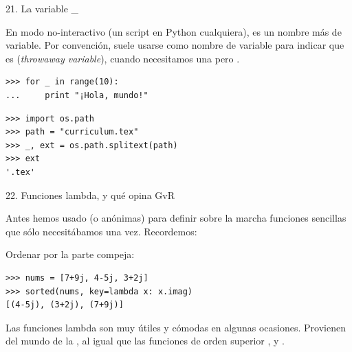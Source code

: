 \documentclass[14pt]{beamer}
\begin{document}
\begin{frame}[fragile]{21. La variable \_}
  \begin{block}{}
    \small
    \centering
    En modo no-interactivo (un script en Python cualquiera),
    \structure{\_} es un nombre más de variable. Por convención, suele
    usarse como nombre de variable para indicar que es
     (\emph{throwaway variable}), cuando
    necesitamos una pero .
  \end{block}

  \footnotesize
  \begin{exampleblock}{}
    \begin{lstlisting}
>>> for _ in range(10):
...     print "¡Hola, mundo!"
    \end{lstlisting}
  \end{exampleblock}


  \begin{exampleblock}{}
    \begin{lstlisting}
>>> import os.path
>>> path = "curriculum.tex"
>>> _, ext = os.path.splitext(path)
>>> ext
'.tex'
    \end{lstlisting}
  \end{exampleblock}
\end{frame}

\begin{frame}[fragile]{22. \large Funciones lambda, y qué opina GvR}
  \small
  \begin{center}
    Antes hemos usado  (o anónimas) para
    definir sobre la marcha funciones sencillas que sólo necesitábamos
    una vez. Recordemos:
  \end{center}

  \footnotesize
  \begin{exampleblock}
    {Ordenar por la parte compeja:}
    \begin{lstlisting}
>>> nums = [7+9j, 4-5j, 3+2j]
>>> sorted(nums, key=lambda x: x.imag)
[(4-5j), (3+2j), (7+9j)]
    \end{lstlisting}
  \end{exampleblock}

  \small
  \begin{block}{}
    \centering
    Las funciones lambda son muy útiles y cómodas en algunas
    ocasiones.  Provienen del mundo de la , al igual que las funciones de orden superior
    ,  y .
  \end{block}
\end{frame}
\end{document}
